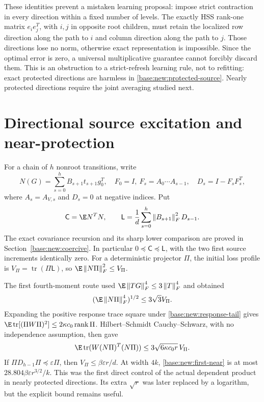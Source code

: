 \documentclass[11pt,oneside,openany,a4paper]{book}
\numberwithin{equation}{chapter}
\theoremstyle{definition}
\theoremstyle{remark}
\newcommand{\F}[1]{\left\lVert#1\right\rVert_F}
\DeclareMathOperator{\tr}{tr}\DeclareMathOperator{\rank}{rank}
\newcommand{\Cov}{\mathsf C}\newcommand{\Loss}{\mathsf L}\newcommand{\Fil}{\mathcal F}
\begin{document}
These identities prevent a mistaken learning proposal: impose strict contraction in every direction within a fixed number of levels. The exactly HSS rank-one matrix $e_ie_j^T$, with $i,j$ in opposite root children, must retain the localized row direction along the path to $i$ and column direction along the path to $j$. Those directions lose no norm, otherwise exact representation is impossible. Since the optimal error is zero, a universal multiplicative guarantee cannot forcibly discard them. This is an obstruction to a strict-refresh learning rule, not to refitting: exact protected directions are harmless in \eqref{base:new:protected-source}. Nearly protected directions require the joint averaging studied next.


\section{Directional source excitation and near-protection}\label{base:new:near}
For a chain of $h$ nonroot transitions, write
\[
 N(G)=\sum_{s=0}^{h}B_{s+1}t_{s+1}g_0^T,\quad
 F_0=I,\ F_s=A_0\cdots A_{s-1},\quad D_s=I-F_sF_s^T,
\]
where $A_s=A_{V,s}$ and $D_s=0$ at negative indices. Put
\begin{equation}\label{base:new:CLdef}
 \Cov=\E N^TN,\qquad
 \Loss=\frac1d\sum_{s=0}^{h}\F{B_{s+1}}^2D_{s-1}.
\end{equation}
The exact covariance recursion and its sharp lower comparison are proved in Section~\ref{base:new:coercive}. In particular $0\preceq\Cov\preceq\Loss$, with the two first source increments identically zero. For a deterministic projector $\Pi$, the initial loss profile is
$V_\Pi=\tr(\Pi\Loss)$, so $\E\F{N\Pi}^2\le V_\Pi$.

The first fourth-moment route used $\E\F{TG}^4\le3\F T^4$ and obtained
\[
 (\E\F{N\Pi}^4)^{1/2}\le3\sqrt3 V_\Pi.
\]
Expanding the positive response trace square under \eqref{base:new:response-tail} gives
$\E\tr[(\Pi W\Pi)^2]\le2\kappa c_0\rank\Pi$. Hilbert--Schmidt Cauchy--Schwarz, with no independence assumption, then gave
\begin{equation}\label{base:new:first-near}
 \E\tr(W(N\Pi)^T(N\Pi))\le3\sqrt{6\kappa c_0r}\,V_\Pi.
\end{equation}
If $\Pi D_{h-1}\Pi\preceq\varepsilon\Pi$, then $V_\Pi\le\beta\varepsilon r/d$. At width $4k$, \eqref{base:new:first-near} is at most $28.804\beta\varepsilon r^{3/2}/k$. This was the first direct control of the actual dependent product in nearly protected directions. Its extra $\sqrt r$ was later replaced by a logarithm, but the explicit bound remains useful.
\end{document}
